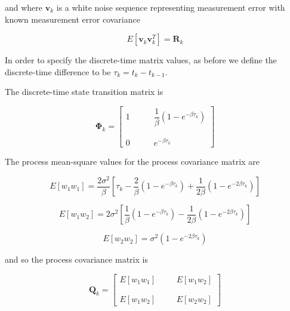 \documentclass[12pt]{article}
\begin{document}
and where $\mathbf{v}_k$ is a white noise sequence representing measurement error with
known measurement error covariance

\begin{equation}
    E[\mathbf{v}_k \mathbf{v}_k^T] = \mathbf{R}_k
    \label{eq:IGM-discrete-measurement-covariance}
\end{equation}

In order to specify the discrete-time matrix values, as before we define the discrete-time
difference to be $\tau_k = t_k - t_{k-1}$.

The discrete-time state transition matrix is

\begin{equation}
    \mathbf{\Phi}_k = 
    \begin{bmatrix}
    1  & \phantom{m} &  \dfrac{1}{\beta} \left ( 1 - e^{- \beta \tau_k} \right ) \\
    \phantom{m} \\
    0  & \phantom{m} &  e^{- \beta \tau_k}
    \end{bmatrix}
    \label{eq:IGM-state-transition}
\end{equation}

The process mean-square values for the process covariance matrix are

\begin{equation}
    E[w_1 w_1] = \frac{2 \sigma^2}{\beta}
        \left [
            \tau_k - \frac{2}{\beta} \left ( 1 - e^{- \beta \tau_k} \right )
                   + \frac{1}{2 \beta} \left ( 1 - e^{-2 \beta \tau_k} \right )
        \right ]
    \label{eq:IGM-Ex1x1}
\end{equation}

\begin{equation}
    E[w_1 w_2] = 2 \sigma^2
        \left [
            \frac{1}{\beta} \left ( 1 - e^{- \beta \tau_k} \right )
            - \frac{1}{2 \beta} \left ( 1 - e^{-2 \beta \tau_k} \right )
        \right ]
    \label{eq:IGM-Ex1x2}
\end{equation}

\begin{equation}
    E[w_2 w_2] = \sigma^2 \left ( 1 - e^{-2 \beta \tau_k} \right )
    \label{eq:IGM-Ex2x2}
\end{equation}

and so the process covariance matrix is

\begin{equation}
    \mathbf{Q}_k = 
    \begin{bmatrix}
    E[w_1 w_1]  & \phantom{m} &  E[w_1 w_2] \\
    \phantom{m} \\
    E[w_1 w_2]  & \phantom{m} &  E[w_2 w_2]
    \end{bmatrix}
    \label{eq:IGM-process-Q}
\end{equation}
\end{document}
